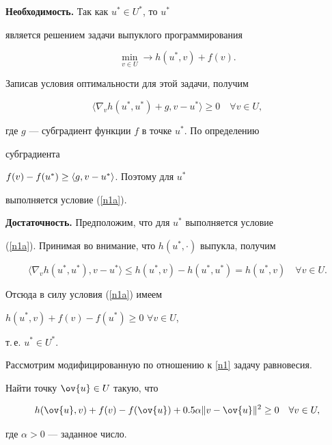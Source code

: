 \begin{pf}


{\bf Необходимость.} Так как $u^* \in U^*$, то $u^*$ 


является решением задачи выпуклого программирования


$$


\min \limits_{v \in U} \rightarrow h(u^*,v) + f(v).


$$


Записав условия оптимальности для этой задачи, получим


$$


\langle \nabla_v h(u^*,u^*) + g, v - u^* \rangle\ge0 \quad \forall v \in U,


$$


где $g$ --- субградиент функции $f$  в точке $u^*$. По определению 


субградиента


$f(v) - f(u^*) \ge\linebreak \langle g, v - u^* \rangle$. Поэтому для $u^*$ 


выполняется условие (\ref{n1a}).


\medskip





{\bf Достаточность.} Предположим, что для $u^*$ выполняется условие 


(\ref{n1a}). Принимая во внимание, что $h(u^*,\cdot)$ выпукла, получим 


$$


\langle \nabla_v h(u^*,u^*), v - u^* \rangle


\le h(u^*,v) - h(u^*, u^*) = h(u^*,v)


\quad \forall v \in U.


$$


Отсюда в силу условия (\ref{n1a}) имеем


$h(u^*,v) + f(v) - f(u^*) \ge 0$ $\forall v \in U$,


т.\,е. $u^* \in U^*.$


\end{pf}








Рассмотрим модифицированную по отношению к \ref{n1} задачу равновесия. 





\begin{probs}\label{n2}


Найти точку $\ov{u} \in U$ такую, что 


$$


h(\ov{u},v) + f(v) - f(\ov{u}) + 0.5 \alpha \|v-\ov{u}\|^2 \ge 0


\quad \forall v \in U,


$$


где $\alpha > 0$ --- заданное число.


\end{probs}





